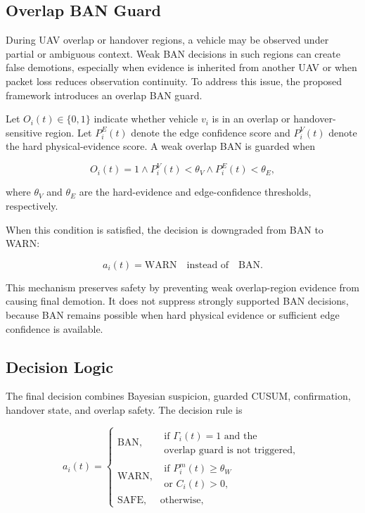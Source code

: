 \documentclass[journal]{IEEEtran}
\begin{document}
\subsection{Overlap BAN Guard}
\label{subsec:overlap_ban_guard}

During UAV overlap or handover regions, a vehicle may be observed under partial or ambiguous context. Weak BAN decisions in such regions can create false demotions, especially when evidence is inherited from another UAV or when packet loss reduces observation continuity. To address this issue, the proposed framework introduces an overlap BAN guard.

Let \(O_i(t)\in\{0,1\}\) indicate whether vehicle \(v_i\) is in an overlap or handover-sensitive region. Let \(P_i^{E}(t)\) denote the edge confidence score and \(P_i^{V}(t)\) denote the hard physical-evidence score. A weak overlap BAN is guarded when

\begin{equation}
O_i(t)=1
\land
P_i^{V}(t)<\theta_V
\land
P_i^{E}(t)<\theta_E,
\label{eq:overlap_guard_condition}
\end{equation}

where \(\theta_V\) and \(\theta_E\) are the hard-evidence and edge-confidence thresholds, respectively.

When this condition is satisfied, the decision is downgraded from BAN to WARN:

\begin{equation}
a_i(t)=\text{WARN} \quad \text{instead of} \quad \text{BAN}.
\label{eq:overlap_guard_action}
\end{equation}

This mechanism preserves safety by preventing weak overlap-region evidence from causing final demotion. It does not suppress strongly supported BAN decisions, because BAN remains possible when hard physical evidence or sufficient edge confidence is available.

\subsection{Decision Logic}
\label{subsec:decision_logic}

The final decision combines Bayesian suspicion, guarded CUSUM, confirmation, handover state, and overlap safety. The decision rule is

\begin{equation}
a_i(t)=
\begin{cases}
\text{BAN}, &
\begin{gathered}
\text{if } \Gamma_i(t)=1 \text{ and the}\\
\text{overlap guard is not triggered},
\end{gathered}\\
\text{WARN}, &
\begin{gathered}
\text{if } P_i^{m}(t)\geq \theta_W\\
\text{or } C_i(t)>0,
\end{gathered}\\
\text{SAFE}, & \text{otherwise},
\end{cases}
\label{eq:decision_rule}
\end{equation}
\end{document}
